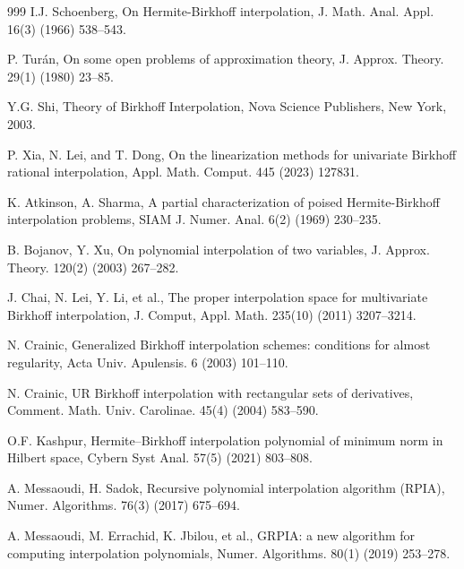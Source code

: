 \documentclass[preprint,12pt]{elsarticle}
\begin{document}




\begin{thebibliography}{999}
I.J. Schoenberg, On Hermite-Birkhoff interpolation, J. Math. Anal. Appl. 16(3) (1966) 538--543.

P. Tur\'{a}n, On some open problems of approximation theory, J. Approx. Theory. 29(1) (1980) 23--85.

Y.G. Shi, Theory of Birkhoff Interpolation, Nova Science Publishers, New York, 2003.

P. Xia, N. Lei, and T. Dong, On the linearization methods for univariate Birkhoff rational interpolation, Appl. Math. Comput. 445 (2023) 127831.
 
K. Atkinson, A. Sharma, A partial characterization of poised Hermite-Birkhoff interpolation problems, SIAM J. Numer. Anal. 6(2) (1969) 230--235.

B. Bojanov, Y. Xu, On polynomial interpolation of two variables, J. Approx. Theory. 120(2) (2003) 267--282.

J. Chai, N. Lei, Y. Li, et al., The proper interpolation space for multivariate Birkhoff interpolation, J. Comput, Appl. Math. 235(10) (2011) 3207--3214.

N. Crainic, Generalized Birkhoff interpolation schemes: conditions for almost regularity, Acta Univ. Apulensis. 6 (2003) 101--110.

N. Crainic, UR Birkhoff interpolation with rectangular sets of derivatives, Comment. Math. Univ. Carolinae. 45(4) (2004) 583--590.

O.F. Kashpur, Hermite–Birkhoff interpolation polynomial of minimum norm in Hilbert space, Cybern Syst Anal. 57(5) (2021) 803--808.

A. Messaoudi, H. Sadok, Recursive polynomial interpolation algorithm (RPIA), Numer. Algorithms. 76(3) (2017) 675--694. 

A. Messaoudi, M. Errachid, K. Jbilou, et al., GRPIA: a new algorithm for computing interpolation polynomials, Numer. Algorithms. 80(1) (2019) 253--278.


\end{thebibliography}
\end{document}
